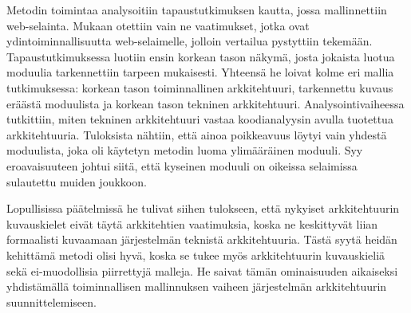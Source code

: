 \documentclass[finnish]{tktltiki2}
\theoremstyle{definition}
\theoremstyle{remark}
\begin{document}
Metodin toimintaa analysoitiin tapaustutkimuksen kautta, jossa mallinnettiin web-selainta. Mukaan otettiin vain ne vaatimukset, jotka ovat ydintoiminnallisuutta web-selaimelle, jolloin vertailua pystyttiin tekemään. Tapaustutkimuksessa luotiin ensin korkean tason näkymä, josta jokaista luotua moduulia tarkennettiin tarpeen mukaisesti. Yhteensä he loivat kolme eri mallia tutkimuksessa: korkean tason toiminnallinen arkkitehtuuri, tarkennettu kuvaus eräästä moduulista ja korkean tason tekninen arkkitehtuuri. Analysointivaiheessa tutkittiin, miten tekninen arkkitehtuuri vastaa koodianalyysin avulla tuotettua arkkitehtuuria. Tuloksista nähtiin, että ainoa poikkeavuus löytyi vain yhdestä moduulista, joka oli käytetyn metodin luoma ylimääräinen moduuli. Syy eroavaisuuteen johtui siitä, että kyseinen moduuli on oikeissa selaimissa sulautettu muiden joukkoon. 

Lopullisissa päätelmissä he tulivat siihen tulokseen, että nykyiset arkkitehtuurin kuvauskielet eivät täytä arkkitehtien vaatimuksia, koska ne keskittyvät liian formaalisti kuvaamaan järjestelmän teknistä arkkitehtuuria. Tästä syytä heidän kehittämä metodi olisi hyvä, koska se tukee myös arkkitehtuurin kuvauskieliä sekä ei-muodollisia piirrettyjä malleja. He saivat tämän ominaisuuden aikaiseksi yhdistämällä toiminnallisen mallinnuksen vaiheen järjestelmän arkkitehtuurin suunnittelemiseen.   
 







%
%
% 
%

%
%




% 
\end{document}
